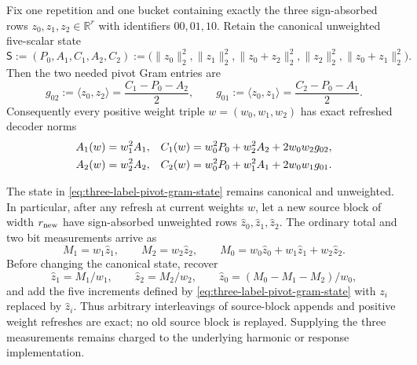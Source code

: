 \begin{theorem}
\label{thm:three-label-pivot-gram-refresh}
Fix one repetition and one bucket containing exactly the three sign-absorbed
rows $z_0,z_1,z_2\in\mathbb R^r$ with identifiers $00,01,10$.  Retain the
canonical unweighted five-scalar state
\begin{equation}
 \mathsf S
 :=(P_0,A_1,C_1,A_2,C_2)
 :=\bigl(
 \|z_0\|_2^2,
 \|z_1\|_2^2,
 \|z_0+z_2\|_2^2,
 \|z_2\|_2^2,
 \|z_0+z_1\|_2^2
 \bigr).
 \label{eq:three-label-pivot-gram-state}
\end{equation}
Then the two needed pivot Gram entries are
\begin{equation}
 g_{02}:=\langle z_0,z_2\rangle
 =\frac{C_1-P_0-A_2}{2},
 \qquad
 g_{01}:=\langle z_0,z_1\rangle
 =\frac{C_2-P_0-A_1}{2}.
 \label{eq:three-label-pivot-recovery}
\end{equation}
Consequently every positive weight triple $w=(w_0,w_1,w_2)$ has exact
refreshed decoder norms
\begin{align}
 A_1(w)&=w_1^2A_1,
 &C_1(w)&=w_0^2P_0+w_2^2A_2+2w_0w_2g_{02},
 \notag\\
 A_2(w)&=w_2^2A_2,
 &C_2(w)&=w_0^2P_0+w_1^2A_1+2w_0w_1g_{01}.
 \label{eq:three-label-pivot-refresh}
\end{align}

The state in \cref{eq:three-label-pivot-gram-state} remains canonical and
unweighted.  In particular, after any refresh at current weights $w$, let a
new source block of width $r_{\rm new}$ have sign-absorbed unweighted rows
$\widehat z_0,\widehat z_1,\widehat z_2$.  The ordinary total and two bit
measurements arrive as
\begin{equation}
 M_1=w_1\widehat z_1,
 \qquad
 M_2=w_2\widehat z_2,
 \qquad
 M_0=w_0\widehat z_0+w_1\widehat z_1+w_2\widehat z_2.
 \label{eq:three-label-weighted-append-measurements}
\end{equation}
Before changing the canonical state, recover
\begin{equation}
 \widehat z_1=M_1/w_1,
 \qquad
 \widehat z_2=M_2/w_2,
 \qquad
 \widehat z_0=(M_0-M_1-M_2)/w_0,
 \label{eq:three-label-unweighted-append-recovery}
\end{equation}
and add the five increments defined by
\cref{eq:three-label-pivot-gram-state} with $z_i$ replaced by
$\widehat z_i$.  Thus arbitrary interleavings of source-block appends and
positive weight refreshes are exact; no old source block is replayed.
Supplying the three measurements remains charged to the underlying harmonic
or response implementation.


\end{theorem}
